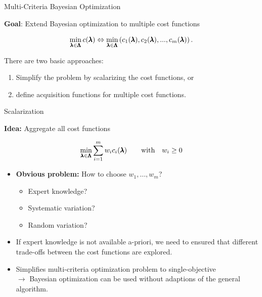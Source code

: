 \begin{frame}{Multi-Criteria Bayesian Optimization}

\textbf{Goal}: Extend Bayesian optimization to multiple cost functions

$$
\min_{\pmb{\lambda} \in \pmb{\Lambda}}  c(\pmb{\lambda}) \Leftrightarrow \min_{\pmb{\lambda} \in \pmb{\Lambda}} \left(c_1(\pmb{\lambda}), c_2(\pmb{\lambda}), ..., c_m(\pmb{\lambda})\right).
$$


    \vspace{0.5cm}

There are two basic approaches:

\begin{enumerate}
        \item Simplify the problem by scalarizing the cost functions, or
        \item define acquisition functions for multiple cost functions.
\end{enumerate}

\end{frame}

\begin{frame}{Scalarization}

    \textbf{Idea:} Aggregate all cost functions


    $$\min_{\pmb{\lambda} \in \pmb{\Lambda}} \sum_{i = 1}^m w_i c_i(\pmb{\lambda}) \qquad \text{with} \quad w_i \ge 0 $$

    \begin{itemize}
        \item \textbf{Obvious problem:} How to choose $w_1, \dots, w_m$?
            \begin{itemize}
                \item Expert knowledge?
                \item Systematic variation?
                \item Random variation?
            \end{itemize}
        \item If expert knowledge is not available a-priori, we need to ensured that different trade-offs between the cost functions are explored.
            \item Simplifies multi-criteria optimization problem to single-objective \\$\longrightarrow$ Bayesian optimization can be used without adaptions of the general algorithm.
    \end{itemize}

\end{frame}

